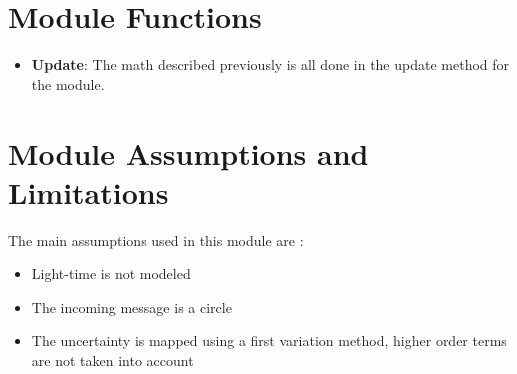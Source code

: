 

\section{Module Functions}
\begin{itemize}
	\item \textbf{Update}: The math described previously is all done in the update method for the module.
\end{itemize}

\section{Module Assumptions and Limitations}

The main assumptions used in this module are :

\begin{itemize}
\item Light-time is not modeled
\item The incoming message is a circle
\item The uncertainty is mapped using a first variation method, higher order terms are not taken into account
\end{itemize}